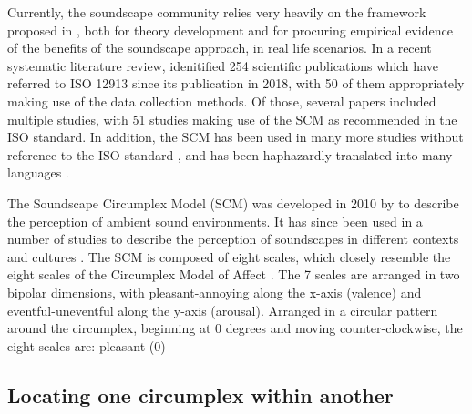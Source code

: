 \documentclass[
  authoryear,
  preprint,
  3p]{elsarticle}
\begin{document}
Currently, the soundscape community relies very heavily on the framework
proposed in \citet{ISO12913Part2}, both for theory development and for
procuring empirical evidence of the benefits of the soundscape approach,
in real life scenarios. In a recent systematic literature review,
\citet{Aletta2023Adoption} idenitified 254 scientific publications which
have referred to ISO 12913 since its publication in 2018, with 50 of
them appropriately making use of the data collection methods. Of those,
several papers included multiple studies, with 51 studies making use of
the SCM as recommended in the ISO standard. In addition, the SCM has
been used in many more studies without reference to the ISO standard
\citep{Engel2018Review}, and has been haphazardly translated into many
languages
\citep{Tarlao2016Comparing, Nagahata2019Examination, Tarlao2020Investigating, Aletta2019Exploringa}.

The Soundscape Circumplex Model (SCM) was developed in 2010 by
\citet{Axelsson2010principal} to describe the perception of ambient
sound environments. It has since been used in a number of studies to
describe the perception of soundscapes in different contexts and
cultures \citep{ISO12913Part2}. The SCM is composed of eight scales,
which closely resemble the eight scales of the Circumplex Model of
Affect \citep{Russell1980circumplex}. The 7 scales are arranged in two
bipolar dimensions, with pleasant-annoying along the x-axis (valence)
and eventful-uneventful along the y-axis (arousal). Arranged in a
circular pattern around the circumplex, beginning at 0 degrees and
moving counter-clockwise, the eight scales are: pleasant (0)

\subsection{Locating one circumplex within
another}\label{locating-one-circumplex-within-another}
\end{document}
